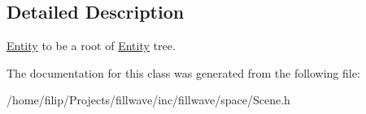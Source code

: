 \subsection{Detailed Description}
\hyperlink{classflw_1_1flf_1_1Entity}{Entity} to be a root of \hyperlink{classflw_1_1flf_1_1Entity}{Entity} tree. 

The documentation for this class was generated from the following file\+:\begin{DoxyCompactItemize}
\item 
/home/filip/\+Projects/fillwave/inc/fillwave/space/Scene.\+h\end{DoxyCompactItemize}
